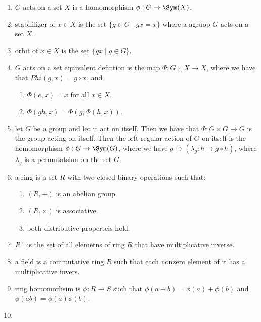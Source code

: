 \begin{enumerate}
	\item $G$ acts on a set $X$ is a homomorphism $\phi: G \to \Sym(X)$. 
	\item stabililizer of $x \in X$ is the set $\{g \in G \mid gx = x\}$ where a agruop $G$ acts on a set $X$. 
	\item orbit of $x \in X$ is the set $\{gx \mid g \in G\}$. 
	\item $G$ acts on a set equivalent defintion is the map $\Phi: G \times X \to X$, where we have that $Phi(g,x) = g \circ x $, and 
	\begin{enumerate}
		\item $\Phi(e,x)=x$ for all $x \in X$. 
		\item $\Phi(gh,x) = \Phi(g,\Phi(h,x))$. 
	\end{enumerate}
	\item let $G$ be a group and let it act on itself. Then we have that $\Phi: G \times G \to G$ is the group acting on itself. Then the left regular action of $G$ on itself is the homomorphism $\phi: G \to \Sym(G)$, where we have $g \mapsto (\lambda_g: h \mapsto g \circ h)$, where $\lambda_g$ is a permutatsion on the set $G$. 
	\item a ring is a set $R$ with two closed binary operations such that: 
	\begin{enumerate}
		\item $(R,+)$ is an abelian group. 
		\item $(R,\times)$ is associative. 
		\item both distributive properteis hold. 
	\end{enumerate}
	\item $R^\times$ is the set of all elemetns of ring $R$ that have multiplicative inverse. 
	\item a field is a commutative ring $R$ such that each nonzero element of it has a multiplicative invers. 
	\item ring homomorhsim is $\phi: R \to S$ such that $\phi(a+b) = \phi(a) + \phi(b)$ and $\phi(ab) = \phi(a)\phi(b)$. 
	\item 
\end{enumerate}

